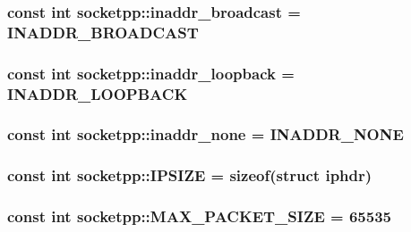 \hypertarget{namespacesocketpp_733551c5151802fc12691a868a366a5f}{
\subsubsection[{inaddr\_\-broadcast}]{\setlength{\rightskip}{0pt plus 5cm}const int {\bf socketpp::inaddr\_\-broadcast} = INADDR\_\-BROADCAST}}
\label{namespacesocketpp_733551c5151802fc12691a868a366a5f}


\hypertarget{namespacesocketpp_8a9e04cf907ec163f43cf6c3bf9e213c}{
\subsubsection[{inaddr\_\-loopback}]{\setlength{\rightskip}{0pt plus 5cm}const int {\bf socketpp::inaddr\_\-loopback} = INADDR\_\-LOOPBACK}}
\label{namespacesocketpp_8a9e04cf907ec163f43cf6c3bf9e213c}


\hypertarget{namespacesocketpp_26bb72049a9cf272f6c116b0a2187c0b}{
\subsubsection[{inaddr\_\-none}]{\setlength{\rightskip}{0pt plus 5cm}const int {\bf socketpp::inaddr\_\-none} = INADDR\_\-NONE}}
\label{namespacesocketpp_26bb72049a9cf272f6c116b0a2187c0b}


\hypertarget{namespacesocketpp_1beda002d2e23bf757355444fd9279e2}{
\subsubsection[{IPSIZE}]{\setlength{\rightskip}{0pt plus 5cm}const int {\bf socketpp::IPSIZE} = sizeof(struct iphdr)}}
\label{namespacesocketpp_1beda002d2e23bf757355444fd9279e2}


\hypertarget{namespacesocketpp_11f9a39ced6614326ba993c3245d8912}{
\subsubsection[{MAX\_\-PACKET\_\-SIZE}]{\setlength{\rightskip}{0pt plus 5cm}const int {\bf socketpp::MAX\_\-PACKET\_\-SIZE} = 65535}}
\label{namespacesocketpp_11f9a39ced6614326ba993c3245d8912}


